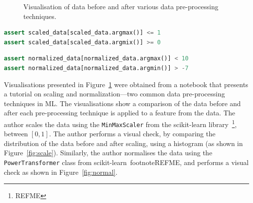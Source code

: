 \documentclass[conference]{IEEEtran}
\begin{document}
\begin{figure}
  \caption{Visualisation of data before and after various data pre-processing techniques.}
  \label{fig:data-pre-process}
\end{figure}

\begin{lstlisting}[language=Python, caption={Assertion to check that the mix and max of a feature fall within specified threshold derived from the visualisation presented in Figure~\ref{fig:scale}.}, label={lst:scale}]
assert scaled_data[scaled_data.argmax()] <= 1
assert scaled_data[scaled_data.argmix()] >= 0
\end{lstlisting}

\begin{lstlisting}[language=Python, caption={Similar premise as Listing~\ref{lst:scale}, however this assertion is based on Figure~\ref{fig:normal}.}, label={lst:normal}]
assert normalized_data[normalized_data.argmax()] < 10
assert normalized_data[normalized_data.argmin()] > -7
\end{lstlisting}

Visualisations presented in Figure~\ref{fig:data-pre-process} were obtained from a notebook that presents a tutorial on scaling and normalization---two common data pre-processing techniques in ML. The visualisations show a comparison of the data before and after each pre-processing technique is applied to a feature from the data. The author scales the data using the \texttt{MinMaxScaler} from the scikit-learn library~\footnote{REFME}, between $[0, 1]$. The author performs a visual check, by comparing the distribution of the data before and after scaling, using a histogram (as shown in Figure~\ref{fig:scale}). Similarly, the author normalises the data using the \texttt{PowerTransformer} class from scikit-learn~footnote{REFME}, and performs a visual check as shown in Figure~\ref{fig:normal}.
\end{document}
